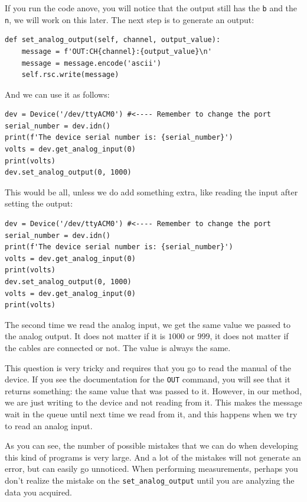 If you run the code anove, you will notice that the output still has the \texttt{b} and the \texttt{\\n}, we will work on this later. The next step is to generate an output:

\begin{verbatim}
def set_analog_output(self, channel, output_value):
    message = f'OUT:CH{channel}:{output_value}\n'
    message = message.encode('ascii')
    self.rsc.write(message)
\end{verbatim}

And we can use it as follows:

\begin{verbatim}
dev = Device('/dev/ttyACM0') #<---- Remember to change the port
serial_number = dev.idn()
print(f'The device serial number is: {serial_number}')
volts = dev.get_analog_input(0)
print(volts)
dev.set_analog_output(0, 1000)
\end{verbatim}

This would be all, unless we do add something extra, like reading the input after setting the output:

\begin{verbatim}
dev = Device('/dev/ttyACM0') #<---- Remember to change the port
serial_number = dev.idn()
print(f'The device serial number is: {serial_number}')
volts = dev.get_analog_input(0)
print(volts)
dev.set_analog_output(0, 1000)
volts = dev.get_analog_input(0)
print(volts)
\end{verbatim}

The second time we read the analog input, we get the same value we passed to the analog output. It does not matter if it is $1000$ or $999$, it does not matter if the cables are connected or not. The value is always the same.


This question is very tricky and requires that you go to read the manual of the device. If you see the documentation for the \texttt{OUT} command, you will see that it returns something: the same value that was passed to it. However, in our method, we are just writing to the device and not reading from it. This makes the message wait in the queue until next time we read from it, and this happens when we try to read an analog input.

As you can see, the number of possible mistakes that we can do when developing this kind of programs is very large. And a lot of the mistakes will not generate an error, but can easily go unnoticed. When performing measurements, perhaps you don't realize the mistake on the \texttt{set\_analog\_output} until you are analyzing the data you acquired.

